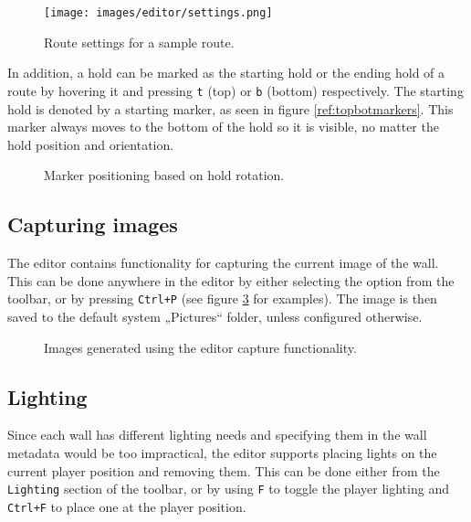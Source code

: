 \begin{figure}[h]
	\centering
	\texttt{[image: images/editor/settings.png]}
	\caption{Route settings for a sample route.}%
	\label{fig:routesettings}
\end{figure}

In addition, a hold can be marked as the starting hold or the ending hold of a route by hovering it and pressing \verb|t| (top) or \verb|b| (bottom) respectively.
The starting hold is denoted by a starting marker, as seen in figure \ref{ref:topbotmarkers}.
This marker always moves to the bottom of the hold so it is visible, no matter the hold position and orientation.

\begin{figure}[h]
	\centering
	\hfill
	\hfill
	\hfill
	\caption{Marker positioning based on hold rotation.}%
	\label{fig:topbotmarkers}
\end{figure}

\subsection{Capturing images}
The editor contains functionality for capturing the current image of the wall.
This can be done anywhere in the editor by either selecting the option from the toolbar, or by pressing \verb|Ctrl+P| (see figure \ref{fig:capture} for examples).
The image is then saved to the default system „Pictures“ folder, unless configured otherwise.

\begin{figure}[h]
	\centering
	\hfill
	\caption{Images generated using the editor capture functionality.}%
	\label{fig:capture}
\end{figure}

\subsection{Lighting}
Since each wall has different lighting needs and specifying them in the wall metadata would be too impractical, the editor supports placing lights on the current player position and removing them.
This can be done either from the \verb|Lighting| section of the toolbar, or by using \verb|F| to toggle the player lighting and \verb|Ctrl+F| to place one at the player position.


